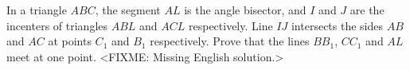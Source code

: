 \problem{}
In a triangle $ABC$, the segment $AL$ is the angle bisector, and $I$ and
$J$ are the incenters of triangles $ABL$ and $ACL$ respectively.
Line $IJ$ intersects the sides $AB$ and $AC$ at points $C_1$ and $B_1$
respectively.
Prove that the lines $B B_1$, $C C_1$ and $AL$ meet at one point.
\solution
<FIXME: Missing English solution.>
\endproblem
